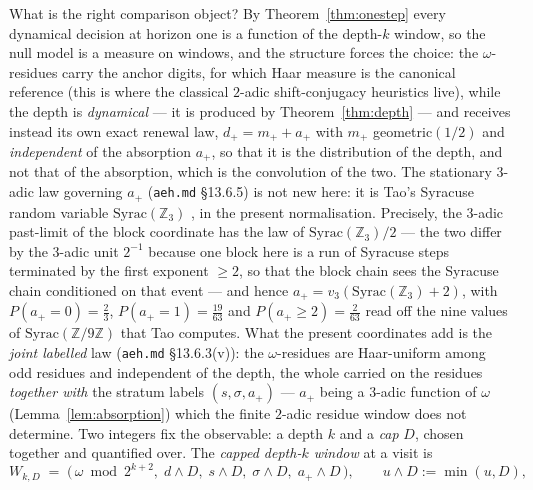 \documentclass[11pt]{article}
\theoremstyle{remark}
\newcommand{\Z}{\mathbb{Z}}
\newcommand{\vth}[1]{v_3\!\left(#1\right)}
\newcommand{\w}{\omega}
\newcommand{\dnext}{d_{+}}
\begin{document}
What is the right comparison object? By Theorem~\ref{thm:onestep} every dynamical decision at horizon one is a function of the depth-$k$ window, so the null model is a measure on windows, and the structure forces the choice: the $\w$-residues carry the anchor digits, for which Haar measure is the canonical reference (this is where the classical $2$-adic shift-conjugacy heuristics live), while the depth is \emph{dynamical} --- it is produced by Theorem~\ref{thm:depth} --- and receives instead its own exact renewal law, $\dnext = m_+ + a_+$ with $m_+$ geometric$(1/2)$ and \emph{independent} of the absorption $a_+$, so that it is the distribution of the depth, and not that of the absorption, which is the convolution of the two. The stationary $3$-adic law governing $a_+$ (\texttt{aeh.md} \S13.6.5) is not new here: it is Tao's Syracuse random variable $\mathrm{Syrac}(\Z_3)$ \cite[Lemma~1.12 and Remark~1.13]{tao}, in the present normalisation. Precisely, the $3$-adic past-limit of the block coordinate has the law of $\mathrm{Syrac}(\Z_3)/2$ --- the two differ by the $3$-adic unit $2^{-1}$ because one block here is a run of Syracuse steps terminated by the first exponent $\ge 2$, so that the block chain sees the Syracuse chain conditioned on that event --- and hence $a_+ = \vth{\mathrm{Syrac}(\Z_3) + 2}$, with $P(a_+ = 0) = \tfrac23$, $P(a_+ = 1) = \tfrac{19}{63}$ and $P(a_+ \ge 2) = \tfrac{2}{63}$ read off the nine values of $\mathrm{Syrac}(\Z/9\Z)$ that Tao computes. What the present coordinates add is the \emph{joint labelled} law (\texttt{aeh.md} \S13.6.3(v)): the $\w$-residues are Haar-uniform among odd residues and independent of the depth, the whole carried on the residues \emph{together with} the stratum labels $(s,\sigma,a_+)$ --- $a_+$ being a $3$-adic function of $\w$ (Lemma~\ref{lem:absorption}) which the finite $2$-adic residue window does not determine. Two integers fix the observable: a depth $k$ and a \emph{cap} $D$, chosen together and quantified over. The \emph{capped depth-$k$ window} at a visit is
\[
  W_{k,D} \;=\; \bigl(\, \w \bmod 2^{k+2},\; d \wedge D,\; s \wedge D,\;
  \sigma \wedge D,\; a_+ \wedge D \,\bigr), \qquad u \wedge D := \min(u,D),
\]
\end{document}
